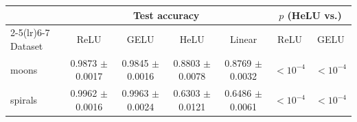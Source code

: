 \begin{tabular}{lcccccc}
\toprule
 & \multicolumn{4}{c}{Test accuracy} & \multicolumn{2}{c}{$p$ (HeLU vs.)} \\
\cmidrule(lr){2-5}\cmidrule(lr){6-7}
Dataset & ReLU & GELU & HeLU & Linear & ReLU & GELU \\
\midrule
moons & 0.9873 $\pm$ 0.0017 & 0.9845 $\pm$ 0.0016 & 0.8803 $\pm$ 0.0078 & 0.8769 $\pm$ 0.0032 & $<10^{-4}$ & $<10^{-4}$ \\
spirals & 0.9962 $\pm$ 0.0016 & 0.9963 $\pm$ 0.0024 & 0.6303 $\pm$ 0.0121 & 0.6486 $\pm$ 0.0061 & $<10^{-4}$ & $<10^{-4}$ \\
\bottomrule
\end{tabular}
